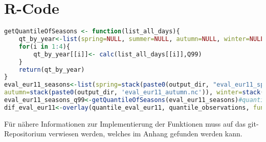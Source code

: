 \section{R-Code}
\begin{lstlisting}[language = R]
getQuantileOfSeasons <- function(list_all_days){
	qt_by_year<-list(spring=NULL, summer=NULL, autumn=NULL, winter=NULL)
	for(i in 1:4){
		qt_by_year[[i]]<- calc(list_all_days[[i]],Q99)
	}
	return(qt_by_year)
}
eval_eur11_seasons<-list(spring=stack(paste0(output_dir, "eval_eur11_spring.nc")), summer= stack(paste0(output_dir, "eval_eur11_summer.nc")),
autumn=stack(paste0(output_dir, 'eval_eur11_autumn.nc')), winter=stack(paste0(output_dir, 'eval_eur11_winter.nc'))) # Zuvor aufsplitten der Daten in die Jahreszeiten
eval_eur11_seasons_q99<-getQuantileOfSeasons(eval_eur11_seasons)#quantile berechnen
dif_eval_eur11<-overlay(quantile_eval_eur11, quantile_observations, fun=function(x,y){return((x - y))})# differenzen Berechnen
\end{lstlisting}
\vspace{20pt}
Für nähere Informationen zur Implementierung der Funktionen muss auf das git-Repositorium verwiesen werden, welches im Anhang gefunden werden kann.